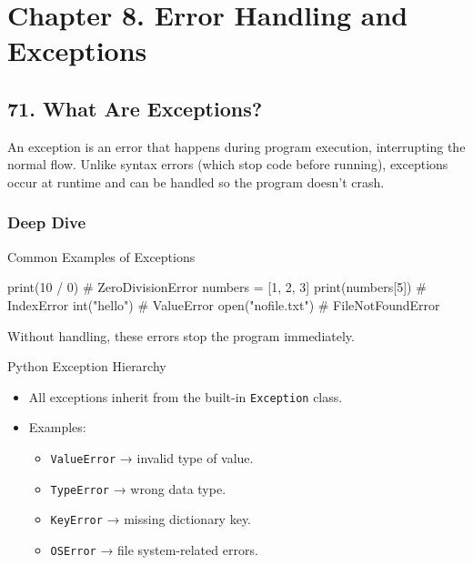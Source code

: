 \documentclass[
  letterpaper,
  DIV=11,
  numbers=noendperiod]{scrreprt}
\newenvironment{Shaded}{\begin{snugshade}}{\end{snugshade}}
\newcommand{\BuiltInTok}[1]{\textcolor[rgb]{0.00,0.23,0.31}{#1}}
\newcommand{\CommentTok}[1]{\textcolor[rgb]{0.37,0.37,0.37}{#1}}
\newcommand{\DecValTok}[1]{\textcolor[rgb]{0.68,0.00,0.00}{#1}}
\newcommand{\NormalTok}[1]{\textcolor[rgb]{0.00,0.23,0.31}{#1}}
\newcommand{\OperatorTok}[1]{\textcolor[rgb]{0.37,0.37,0.37}{#1}}
\newcommand{\StringTok}[1]{\textcolor[rgb]{0.13,0.47,0.30}{#1}}
\providecommand{\tightlist}{%
  \setlength{\itemsep}{0pt}\setlength{\parskip}{0pt}}
\begin{document}
\section{Chapter 8. Error Handling and
Exceptions}\label{chapter-8.-error-handling-and-exceptions}

\subsection{71. What Are Exceptions?}\label{what-are-exceptions}

An exception is an error that happens during program execution,
interrupting the normal flow. Unlike syntax errors (which stop code
before running), exceptions occur at runtime and can be handled so the
program doesn't crash.

\subsubsection{Deep Dive}\label{deep-dive-70}

Common Examples of Exceptions

\begin{Shaded}
\begin{Highlighting}[]
\BuiltInTok{print}\NormalTok{(}\DecValTok{10} \OperatorTok{/} \DecValTok{0}\NormalTok{)       }\CommentTok{\# ZeroDivisionError}
\NormalTok{numbers }\OperatorTok{=}\NormalTok{ [}\DecValTok{1}\NormalTok{, }\DecValTok{2}\NormalTok{, }\DecValTok{3}\NormalTok{]}
\BuiltInTok{print}\NormalTok{(numbers[}\DecValTok{5}\NormalTok{])   }\CommentTok{\# IndexError}
\BuiltInTok{int}\NormalTok{(}\StringTok{"hello"}\NormalTok{)        }\CommentTok{\# ValueError}
\BuiltInTok{open}\NormalTok{(}\StringTok{"nofile.txt"}\NormalTok{)  }\CommentTok{\# FileNotFoundError}
\end{Highlighting}
\end{Shaded}

Without handling, these errors stop the program immediately.

Python Exception Hierarchy

\begin{itemize}
\item
  All exceptions inherit from the built-in \texttt{Exception} class.
\item
  Examples:

  \begin{itemize}
  \tightlist
  \item
    \texttt{ValueError} → invalid type of value.
  \item
    \texttt{TypeError} → wrong data type.
  \item
    \texttt{KeyError} → missing dictionary key.
  \item
    \texttt{OSError} → file system-related errors.
  \end{itemize}
\end{itemize}
\end{document}

